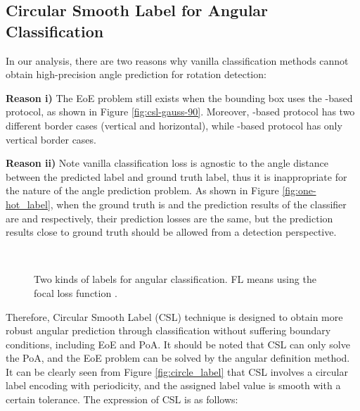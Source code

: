 \documentclass[10pt,journal,compsoc]{IEEEtran}
\begin{document}
\subsection{Circular Smooth Label for Angular Classification}\label{sec:csl}
In our analysis, there are two reasons why vanilla classification methods cannot obtain high-precision angle prediction for rotation detection: 

\textbf{Reason i)} The EoE problem still exists when the bounding box uses the -based protocol, as shown in Figure \ref{fig:csl-gauss-90}. Moreover, -based protocol has two different border cases (vertical and horizontal), while -based protocol has only vertical border cases. 

\textbf{Reason ii)}  Note vanilla classification loss is agnostic to the angle distance between the predicted label and ground truth label, thus it is inappropriate for the nature of the angle prediction problem. As shown in Figure \ref{fig:one-hot_label}, when the ground truth is  and the prediction results of the classifier are  and  respectively, their prediction losses are the same, but the prediction results close to ground truth should be allowed from a detection perspective.

\begin{figure}[!tb]
	\centering
	\\
	\centering
	\caption{Two kinds of labels for angular classification. FL means using the focal loss function \cite{lin2017focal}.}
	\label{fig:label}
\end{figure}

Therefore, Circular Smooth Label (CSL) technique is designed to obtain more robust angular prediction through classification without suffering boundary conditions, including EoE and PoA. It should be noted that CSL can only solve the PoA, and the EoE problem can be solved by the  angular definition method. It can be clearly seen from Figure \ref{fig:circle_label} that CSL involves a circular label encoding with periodicity, and the assigned label value is smooth with a certain tolerance. The expression of CSL is as follows:
\end{document}
